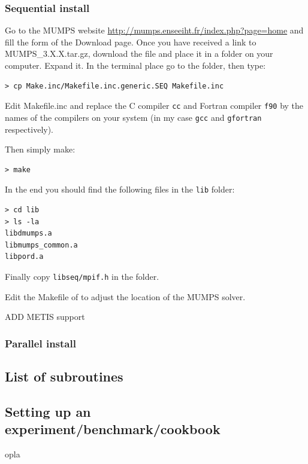 \subsubsection{Sequential install}

Go to the MUMPS website \url{http://mumps.enseeiht.fr/index.php?page=home} and 
fill the form of the Download page. 
Once you have received a link to {\filenamefont MUMPS\_3.X.X.tar.gz}, download
the file and place it in a folder on your computer. Expand it. 
In the terminal place go to the folder, then type:
\begin{verbatim}
> cp Make.inc/Makefile.inc.generic.SEQ Makefile.inc
\end{verbatim}
Edit {\filenamefont Makefile.inc} and replace the C compiler {\tt cc} 
and Fortran compiler {\tt f90} by the names of the compilers on 
your system (in my case {\tt gcc} and {\tt gfortran} respectively).

Then simply make:
\begin{verbatim}
> make 
\end{verbatim}
In the end you should find the following files in the {\tt lib} folder:
\begin{verbatim}
> cd lib
> ls -la
libdmumps.a
libmumps_common.a
libpord.a
\end{verbatim}
Finally copy {\tt libseq/mpif.h} in the \elefant folder.

Edit the Makefile of \elefant to adjust the location of the MUMPS solver.

ADD METIS support

\subsubsection{Parallel install}


\subsection{List of subroutines}



\subsection{Setting up an experiment/benchmark/cookbook}

opla

\begin{center}

\end{center}


